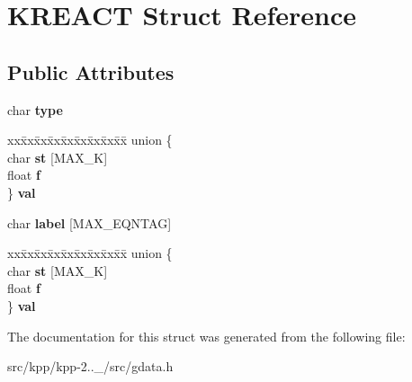 \hypertarget{structKREACT}{}\section{K\+R\+E\+A\+CT Struct Reference}
\label{structKREACT}
\subsection*{Public Attributes}
\begin{DoxyCompactItemize}
\item 
\mbox{\label{structKREACT_a2ae2a08ea47663a0271f36ae81f51a33}} 
char {\bfseries type}
\item 
\mbox{\label{structKREACT_a3d18a31c69a1ee0b159ffc0674911f61}} 
\begin{tabbing}
xx\=xx\=xx\=xx\=xx\=xx\=xx\=xx\=xx\=\kill
union \{\\
\>char {\bfseries st} \mbox{[}MAX\_K\mbox{]}\\
\>float {\bfseries f}\\
\} {\bfseries val}\\

\end{tabbing}\item 
\mbox{\label{structKREACT_a963a2a62e4db79efc3b96e2e560ff7cf}} 
char {\bfseries label} \mbox{[}M\+A\+X\+\_\+\+E\+Q\+N\+T\+AG\mbox{]}
\item 
\mbox{\label{structKREACT_a781c069b4f32f53c50d18b2eb8696a7e}} 
\begin{tabbing}
xx\=xx\=xx\=xx\=xx\=xx\=xx\=xx\=xx\=\kill
union \{\\
\>char {\bfseries st} \mbox{[}MAX\_K\mbox{]}\\
\>float {\bfseries f}\\
\} {\bfseries val}\\

\end{tabbing}\end{DoxyCompactItemize}


The documentation for this struct was generated from the following file\+:\begin{DoxyCompactItemize}
\item 
src/kpp/kpp-\/2..\+\_/src/gdata.\+h\end{DoxyCompactItemize}
